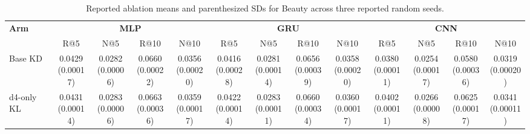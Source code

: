\begin{table}[t]
\centering
\caption{Reported ablation means and parenthesized SDs for Beauty across three reported random seeds.}
\fontsize{6.6}{7.8}\selectfont
\setlength{\tabcolsep}{1.0pt}
\renewcommand{\arraystretch}{1.10}
\begin{tabular*}{\textwidth}{@{\extracolsep{\fill}} l *{12}{c} @{}}
\toprule
\textbf{Arm} & \multicolumn{4}{c}{\textbf{MLP}} & \multicolumn{4}{c}{\textbf{GRU}} & \multicolumn{4}{c}{\textbf{CNN}} \\
\cmidrule(lr){2-5}\cmidrule(lr){6-9}\cmidrule(l){10-13}
 & R@5 & N@5 & R@10 & N@10 & R@5 & N@5 & R@10 & N@10 & R@5 & N@5 & R@10 & N@10 \\
\midrule
Base KD & \shortstack[c]{0.0429\\[-1pt]{\tiny(0.00017)}} & \shortstack[c]{0.0282\\[-1pt]{\tiny(0.00006)}} & \shortstack[c]{0.0660\\[-1pt]{\tiny(0.00022)}} & \shortstack[c]{0.0356\\[-1pt]{\tiny(0.00020)}} & \shortstack[c]{0.0416\\[-1pt]{\tiny(0.00028)}} & \shortstack[c]{0.0281\\[-1pt]{\tiny(0.00014)}} & \shortstack[c]{0.0656\\[-1pt]{\tiny(0.00039)}} & \shortstack[c]{0.0358\\[-1pt]{\tiny(0.00020)}} & \shortstack[c]{0.0380\\[-1pt]{\tiny(0.00011)}} & \shortstack[c]{0.0254\\[-1pt]{\tiny(0.00017)}} & \shortstack[c]{0.0580\\[-1pt]{\tiny(0.00036)}} & \shortstack[c]{0.0319\\[-1pt]{\tiny(0.00020)}} \\
\addlinespace[1pt]
d4-only KL & \shortstack[c]{0.0431\\[-1pt]{\tiny(0.00014)}} & \shortstack[c]{0.0283\\[-1pt]{\tiny(0.00006)}} & \shortstack[c]{0.0663\\[-1pt]{\tiny(0.00036)}} & \shortstack[c]{0.0359\\[-1pt]{\tiny(0.00017)}} & \shortstack[c]{0.0422\\[-1pt]{\tiny(0.00014)}} & \shortstack[c]{0.0283\\[-1pt]{\tiny(0.00011)}} & \shortstack[c]{0.0660\\[-1pt]{\tiny(0.00034)}} & \shortstack[c]{0.0360\\[-1pt]{\tiny(0.00017)}} & \shortstack[c]{0.0402\\[-1pt]{\tiny(0.00011)}} & \shortstack[c]{0.0266\\[-1pt]{\tiny(0.00008)}} & \shortstack[c]{0.0625\\[-1pt]{\tiny(0.00017)}} & \shortstack[c]{0.0341\\[-1pt]{\tiny(0.00011)}} \\

\end{tabular*}
\end{table}
